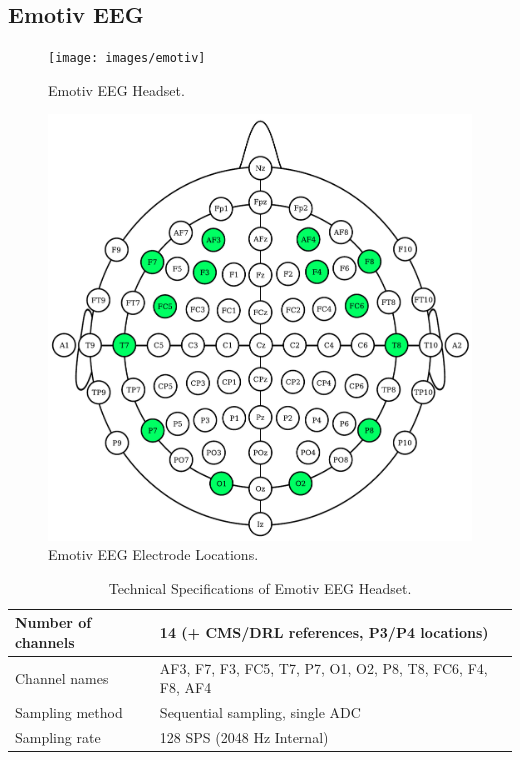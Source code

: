 \documentclass[12pt]{article}
\newcommand\mysubsection[1]{\subsection{#1}}
\numberwithin{equation}{section}
\numberwithin{figure}{section}
\numberwithin{table}{section}
\begin{document}
\mysubsection{Emotiv EEG}\label{seq:emotiveeg}

\par{
    \begin{figure}[ht]
        \centering
        \texttt{[image: images/emotiv]}
        \caption{Emotiv EEG Headset.}
        \label{fig:emotiv_eeg_headset}
    \end{figure}
    \begin{figure}[ht]
        \centering
        \includegraphics[scale=0.5]{images/10_20_emotiv}
        \caption{Emotiv EEG Electrode Locations.}
        \label{fig:emotiv_eeg_1020}
    \end{figure}
    \begin{table}
        \footnotesize
        \centering
        \caption{Technical Specifications of Emotiv EEG Headset.}
        \begin{tabular}{ll}
            \hline
            Number of channels & 14 (+ CMS/DRL references, P3/P4 locations) \\ \hline
            Channel names & AF3, F7, F3, FC5, T7, P7, O1, O2, P8, T8, FC6, F4, F8, AF4 \\ \hline
            Sampling method & Sequential sampling, single ADC \\ \hline
            Sampling rate & 128 SPS (2048 Hz Internal) \\ \hline

\end{tabular}
\end{table}}
\end{document}
